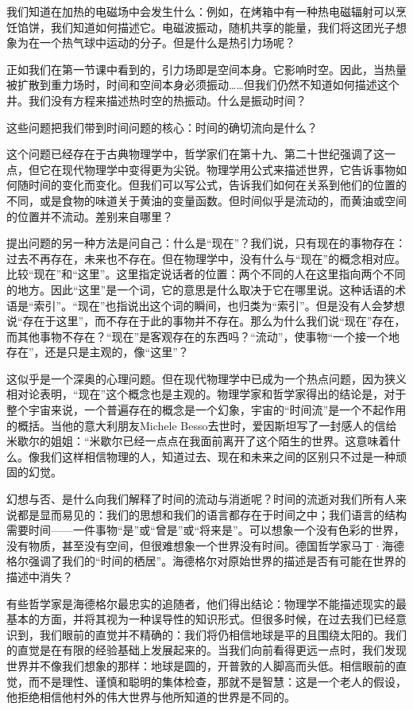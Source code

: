    我们知道在加热的电磁场中会发生什么：例如，在烤箱中有一种热电磁辐射可以烹饪馅饼，我们知道如何描述它。电磁波振动，随机共享的能量，我们将这团光子想象为在一个热气球中运动的分子。但是什么是热引力场呢？

   正如我们在第一节课中看到的，引力场即是空间本身。它影响时空。因此，当热量被扩散到重力场时，时间和空间本身必须振动……但我们仍然不知道如何描述这个井。我们没有方程来描述热时空的热振动。什么是振动时间？

   这些问题把我们带到时间问题的核心：时间的确切流向是什么？

   这个问题已经存在于古典物理学中，哲学家们在第十九、第二十世纪强调了这一点，但它在现代物理学中变得更为尖锐。物理学用公式来描述世界，它告诉事物如何随时间的变化而变化。但我们可以写公式，告诉我们如何在关系到他们的位置的不同，或是食物的味道关于黄油的变量函数。但时间似乎是流动的，而黄油或空间的位置并不流动。差别来自哪里？

   提出问题的另一种方法是问自己：什么是“现在”？我们说，只有现在的事物存在：过去不再存在，未来也不存在。但在物理学中，没有什么与“现在”的概念相对应。比较“现在”和“这里”。这里指定说话者的位置：两个不同的人在这里指向两个不同的地方。因此“这里”是一个词，它的意思是什么取决于它在哪里说。这种话语的术语是“索引”。“现在”也指说出这个词的瞬间，也归类为“索引”。但是没有人会梦想说“存在于这里”，而不存在于此的事物并不存在。那么为什么我们说“现在”存在，而其他事物不存在？“现在”是客观存在的东西吗？“流动”，使事物“一个接一个地存在”，还是只是主观的，像“这里”？

   这似乎是一个深奥的心理问题。但在现代物理学中已成为一个热点问题，因为狭义相对论表明，“现在”这个概念也是主观的。物理学家和哲学家得出的结论是，对于整个宇宙来说，一个普遍存在的概念是一个幻象，宇宙的“时间流”是一个不起作用的概括。当他的意大利朋友Michele Besso去世时，爱因斯坦写了一封感人的信给米歇尔的姐姐：“米歇尔已经一点点在我面前离开了这个陌生的世界。这意味着什么。像我们这样相信物理的人，知道过去、现在和未来之间的区别只不过是一种顽固的幻觉。

   幻想与否、是什么向我们解释了时间的流动与消逝呢？时间的流逝对我们所有人来说都是显而易见的：我们的思想和我们的语言都存在于时间之中；我们语言的结构需要时间——一件事物“是”或“曾是”或“将来是”。可以想象一个没有色彩的世界，没有物质，甚至没有空间，但很难想象一个世界没有时间。德国哲学家马丁·海德格尔强调了我们的“时间的栖居”。海德格尔对原始世界的描述是否有可能在世界的描述中消失？

   有些哲学家是海德格尔最忠实的追随者，他们得出结论：物理学不能描述现实的最基本的方面，并将其视为一种误导性的知识形式。但很多时候，在过去我们已经意识到，我们眼前的直觉并不精确的：我们将仍相信地球是平的且围绕太阳的。我们的直觉是在有限的经验基础上发展起来的。当我们向前看得更远一点时，我们发现世界并不像我们想象的那样：地球是圆的，开普敦的人脚高而头低。相信眼前的直觉，而不是理性、谨慎和聪明的集体检查，那就不是智慧：这是一个老人的假设，他拒绝相信他村外的伟大世界与他所知道的世界是不同的。

